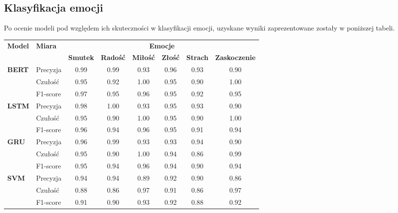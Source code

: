 \subsection{Klasyfikacja emocji}

Po ocenie modeli pod względem ich skuteczności w klasyfikacji emocji, uzyskane wyniki zaprezentowane zostały w poniższej tabeli.

\begin{table}[H]
\centering
\begin{tabular}{|l|l|c|c|c|c|c|c|}
\hline
\multirow{2}{*}{\textbf{Model}} & 
\multirow{2}{*}{\textbf{Miara}} & 
\multicolumn{6}{c|}{\textbf{Emocje}} \\
\cline{3-8}
& & \textbf{Smutek} & \textbf{Radość} & \textbf{Miłość} & 
\textbf{Złość} & \textbf{Strach} & \textbf{Zaskoczenie} \\
\hline
\multirow{3}{*}{\textbf{BERT}} 
& Precyzja & 0.99 & 0.99 & 0.93 & 0.96 & 0.93 & 0.90 \\
& Czułość  & 0.95 & 0.92 & 1.00 & 0.95 & 0.90 & 1.00 \\
& F1-score & \cellcolor{gray!20}0.97 & \cellcolor{gray!20}0.95 & \cellcolor{gray!20}0.96 & \cellcolor{gray!20}0.95 & \cellcolor{gray!20}0.92 & \cellcolor{gray!20}0.95 \\
\hline
\multirow{3}{*}{\textbf{LSTM}} 
& Precyzja & 0.98 & 1.00 & 0.93 & 0.95 & 0.93 & 0.90 \\
& Czułość  & 0.95 & 0.90 & 1.00 & 0.95 & 0.90 & 1.00 \\
& F1-score & \cellcolor{gray!20}0.96 & \cellcolor{gray!20}0.94 & \cellcolor{gray!20}0.96 & \cellcolor{gray!20}0.95 & \cellcolor{gray!20}0.91 & \cellcolor{gray!20}0.94 \\
\hline
\multirow{3}{*}{\textbf{GRU}} 
& Precyzja & 0.96 & 0.99 & 0.93 & 0.93 & 0.94 & 0.90 \\
& Czułość  & 0.95 & 0.90 & 1.00 & 0.94 & 0.86 & 0.99 \\
& F1-score & \cellcolor{gray!20}0.95 & \cellcolor{gray!20}0.94 & \cellcolor{gray!20}0.96 & \cellcolor{gray!20}0.94 & \cellcolor{gray!20}0.90 & \cellcolor{gray!20}0.94 \\
\hline
\multirow{3}{*}{\textbf{SVM}} 
& Precyzja & 0.94 & 0.94 & 0.89 & 0.92 & 0.90 & 0.86 \\
& Czułość  & 0.88 & 0.86 & 0.97 & 0.91 & 0.86 & 0.97 \\
& F1-score & \cellcolor{gray!20}0.91 & \cellcolor{gray!20}0.90 & \cellcolor{gray!20}0.93 & \cellcolor{gray!20}0.92 & \cellcolor{gray!20}0.88 & \cellcolor{gray!20}0.92 \\

\end{tabular}
\end{table}
